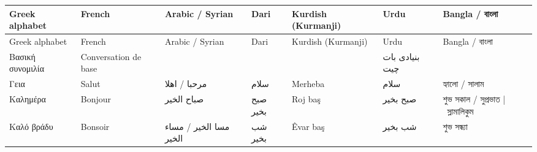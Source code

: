 \begin{longtable}{p{3.5cm} p{3.5cm} p{3.5cm} p{3.5cm} p{3.5cm} p{3.5cm} p{3.5cm} }
\toprule
 Greek alphabet   & French   & Arabic / Syrian   & Dari   & Kurdish (Kurmanji)   & Urdu   & Bangla / বাংলা    \\
\midrule
\endfirsthead
\toprule
 Greek alphabet   & French   & Arabic / Syrian   & Dari   & Kurdish (Kurmanji)   & Urdu   & Bangla / বাংলা    \\
\midrule
\endhead


 Βασική συνομιλία                                                                                                              & Conversation de base                                                                            &                                                                                       &                                                             &                                                                                    & بنیادی بات چیت                                                                 &                                                                   \\
\midrule
 Γεια                                                                                                                          & Salut                                                                                           & مرحبا / اهلا                                                                          & سلام                                                        & Merheba                                                                            & سلام                                                                           & হ্যালো / সালাম                                                    \\
 Καλημέρα                                                                                                                      & Bonjour                                                                                         & صباح الخیر                                                                            & صبح بخیر                                                    & Roj baş                                                                            & صبح بخیر                                                                       & শুভ সকাল / সুপ্রভাত  | স্লামালিকুম                                \\
 Καλό βράδυ                                                                                                                    & Bonsoir                                                                                         & مسا الخير /  مساء الخیر                                                               & شب بخیر                                                     & Êvar baş                                                                           & شب بخیر                                                                        & শুভ সন্ধ্যা                                                       \\

\end{longtable}
